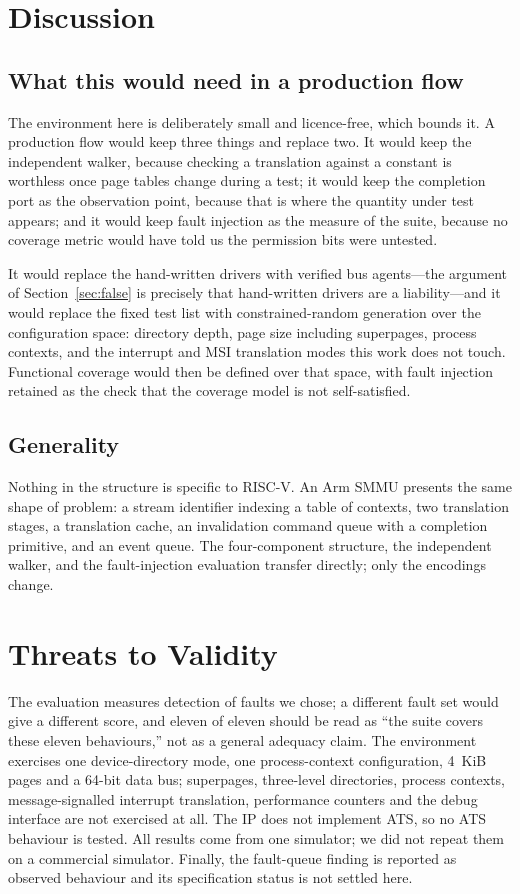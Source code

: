 \documentclass[journal]{IEEEtran}
\begin{document}
\section{Discussion}

\subsection{What this would need in a production flow}
The environment here is deliberately small and licence-free, which bounds it.
A production flow would keep three things and replace two. It would keep the
independent walker, because checking a translation against a constant is
worthless once page tables change during a test; it would keep the completion
port as the observation point, because that is where the quantity under test
appears; and it would keep fault injection as the measure of the suite, because
no coverage metric would have told us the permission bits were untested.

It would replace the hand-written drivers with verified bus agents---the
argument of Section~\ref{sec:false} is precisely that hand-written drivers are a
liability---and it would replace the fixed test list with constrained-random
generation over the configuration space: directory depth, page size including
superpages, process contexts, and the interrupt and MSI translation modes this
work does not touch. Functional coverage would then be defined over that space,
with fault injection retained as the check that the coverage model is not
self-satisfied.

\subsection{Generality}
Nothing in the structure is specific to RISC-V. An Arm SMMU presents the same
shape of problem: a stream identifier indexing a table of contexts, two
translation stages, a translation cache, an invalidation command queue with a
completion primitive, and an event queue. The four-component structure, the
independent walker, and the fault-injection evaluation transfer directly; only
the encodings change.

\section{Threats to Validity}
The evaluation measures detection of faults we chose; a different fault set
would give a different score, and eleven of eleven should be read as ``the suite
covers these eleven behaviours,'' not as a general adequacy claim. The
environment exercises one device-directory mode, one process-context
configuration, 4~KiB pages and a 64-bit data bus; superpages, three-level
directories, process contexts, message-signalled interrupt translation,
performance counters and the debug interface are not exercised at all. The IP
does not implement ATS, so no ATS behaviour is tested. All results come from one
simulator; we did not repeat them on a commercial simulator. Finally, the
fault-queue finding is reported as observed behaviour and its specification
status is not settled here.
\end{document}
